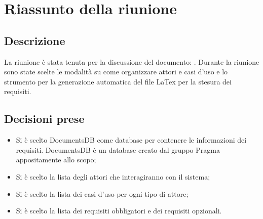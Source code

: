 \section{Riassunto della riunione}
\subsection{Descrizione}

La riunione è stata tenuta per la discussione del documento: \AdR. Durante la riunione sono state scelte le modalità su come organizzare attori e casi d'uso e lo strumento per la generazione automatica del file LaTex per la stesura dei requisiti.

\subsection{Decisioni prese}
\begin{itemize}
\item Si è scelto DocumentsDB come database per contenere le informazioni dei requisiti. DocumentsDB è un database creato dal gruppo Pragma appositamente allo scopo;
\item Si è scelto la lista degli attori che interagiranno con il sistema;
\item Si è scelto la lista dei casi d'uso per ogni tipo di attore;
\item Si è scelto la lista dei requisiti obbligatori e dei requisiti opzionali.
\end{itemize}